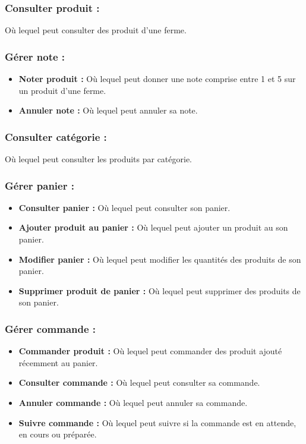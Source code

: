 \documentclass[16pt,fleqn]{article} %
\begin{document}
\subsubsection{Consulter produit :}
Où lequel peut consulter des produit d'une ferme.

\subsubsection{Gérer note :}
\begin{itemize}
    \item \textbf{Noter produit :} Où lequel peut donner une note comprise entre 1 et 5 sur un produit d'une ferme.
    \item \textbf{Annuler note :} Où lequel peut annuler sa note.
\end{itemize}

\subsubsection{Consulter catégorie :}
Où lequel peut consulter les produits par catégorie.

\subsubsection{Gérer panier :}
    \begin{itemize}
        \item \textbf{Consulter panier :} Où lequel peut consulter son panier.
        \item \textbf{Ajouter produit au panier :} Où lequel peut ajouter un produit au son panier.
        \item \textbf{Modifier panier :} Où lequel peut modifier les quantités des produits de son panier.
        \item \textbf{Supprimer produit de panier :} Où lequel peut supprimer des produits de son panier.
    \end{itemize}
    
\subsubsection{Gérer commande :}
    \begin{itemize}
        \item \textbf{Commander produit :} Où lequel peut commander des produit ajouté récemment au panier.
        \item \textbf{Consulter commande :} Où lequel peut consulter sa commande.
        \item \textbf{Annuler commande :} Où lequel peut annuler sa commande.
        \item \textbf{Suivre commande :} Où lequel peut suivre si la commande est en attende, en cours ou préparée.
    \end{itemize}
    
\end{document}
